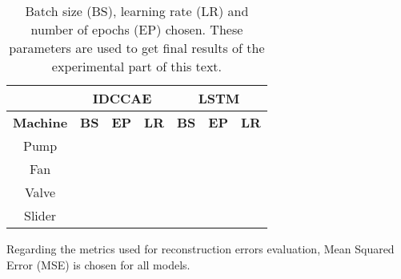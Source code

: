 \begin{table}[ht]
\centering
\begin{tabular}{|c|c|c|c|c|c|c|} 
\cline{2-7}
\multicolumn{1}{c|}{} & \multicolumn{3}{c|}{\textbf{IDCCAE}} & \multicolumn{3}{c|}{\textbf{LSTM}} \\
\hline
\textbf{Machine} & \textbf{BS} & \textbf{EP} & \textbf{LR} & \textbf{BS} & \textbf{EP} & \textbf{LR} \\ 
\hline
Pump &  &  &  &  &  &  \\ 
\hline
Fan &  &  &  &  &  &  \\ 
\hline
Valve &  &  &  &  &  &  \\ 
\hline
Slider &  &  &  &  &  &  \\
\hline
\end{tabular}
\caption{Batch size (BS), learning rate (LR) and number of epochs (EP) chosen. These parameters are used to get final results of the experimental part of this text.}
\label{hyperparam-tables}
\end{table}
Regarding the metrics used for reconstruction errors evaluation, Mean Squared Error (MSE) is chosen for all models.

